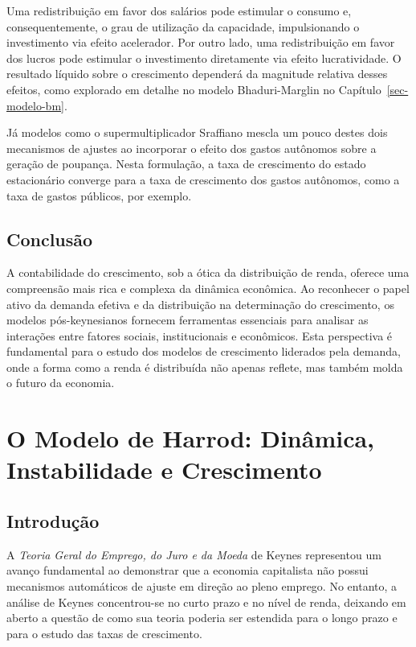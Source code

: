 \documentclass[
  brazilian,
  letterpaper,
  DIV=11,
  numbers=noendperiod]{scrreprt}
\begin{document}
Uma redistribuição em favor dos salários pode estimular o consumo e,
consequentemente, o grau de utilização da capacidade, impulsionando o
investimento via efeito acelerador. Por outro lado, uma redistribuição
em favor dos lucros pode estimular o investimento diretamente via efeito
lucratividade. O resultado líquido sobre o crescimento dependerá da
magnitude relativa desses efeitos, como explorado em detalhe no modelo
Bhaduri-Marglin no Capítulo~\ref{sec-modelo-bm}.

Já modelos como o supermultiplicador Sraffiano mescla um pouco destes
dois mecanismos de ajustes ao incorporar o efeito dos gastos autônomos
sobre a geração de poupança. Nesta formulação, a taxa de crescimento do
estado estacionário converge para a taxa de crescimento dos gastos
autônomos, como a taxa de gastos públicos, por exemplo.

\section{Conclusão}\label{conclusuxe3o}

A contabilidade do crescimento, sob a ótica da distribuição de renda,
oferece uma compreensão mais rica e complexa da dinâmica econômica. Ao
reconhecer o papel ativo da demanda efetiva e da distribuição na
determinação do crescimento, os modelos pós-keynesianos fornecem
ferramentas essenciais para analisar as interações entre fatores
sociais, institucionais e econômicos. Esta perspectiva é fundamental
para o estudo dos modelos de crescimento liderados pela demanda, onde a
forma como a renda é distribuída não apenas reflete, mas também molda o
futuro da economia.


\chapter{O Modelo de Harrod: Dinâmica, Instabilidade e
Crescimento}\label{sec-modelo-harrod}

\section{Introdução}\label{sec-introducao-harrod}

A \emph{Teoria Geral do Emprego, do Juro e da Moeda} de Keynes
representou um avanço fundamental ao demonstrar que a economia
capitalista não possui mecanismos automáticos de ajuste em direção ao
pleno emprego. No entanto, a análise de Keynes concentrou-se no curto
prazo e no nível de renda, deixando em aberto a questão de como sua
teoria poderia ser estendida para o longo prazo e para o estudo das
taxas de crescimento.
\end{document}
